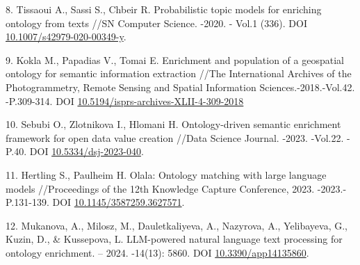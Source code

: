 \begin{references}
8. Tissaoui A., Sassi S., Chbeir R. Probabilistic topic models for
enriching ontology from texts //SN Computer Science. -2020. - Vol.1
(336). DOI
\href{https://link.springer.com/article/10.1007/s42979-020-00349-y}{10.1007/s42979-020-00349-y}.

9. Kokla M., Papadias V., Tomai E. Enrichment and population of a
geospatial ontology for semantic information extraction //The
International Archives of the Photogrammetry, Remote Sensing and Spatial
Information Sciences.-2018.-Vol.42. -P.309-314. DOI
\href{http://dx.doi.org/10.5194/isprs-archives-XLII-4-309-2018}{10.5194/isprs-archives-XLII-4-309-2018}

10. Sebubi O., Zlotnikova I., Hlomani H. Ontology-driven semantic
enrichment framework for open data value creation //Data Science
Journal. -2023. -Vol.22. - P.40. DOI
\href{http://dx.doi.org/10.5334/dsj-2023-040}{10.5334/dsj-2023-040}.

11. Hertling S., Paulheim H. Olala: Ontology matching with large language
models //Proceedings of the 12th Knowledge Capture Conference,
2023. -2023.- P.131-139. DOI
\href{http://dx.doi.org/10.1145/3587259.3627571}{10.1145/3587259.3627571}.

12. Mukanova, A., Milosz, M., Dauletkaliyeva, A., Nazyrova, A.,
Yelibayeva, G., Kuzin, D., \& Kussepova, L. LLM-powered natural language
text processing for ontology enrichment. -- 2024. -14(13): 5860. DOI
\href{http://dx.doi.org/10.3390/app14135860}{10.3390/app14135860}.
\end{references}


